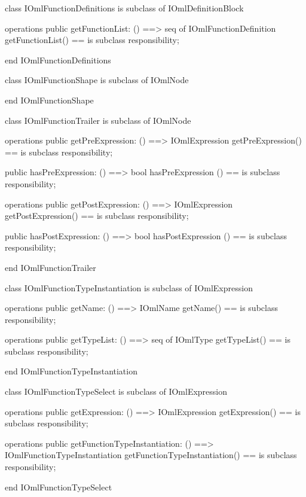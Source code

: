 \begin{vdm_al}
class IOmlFunctionDefinitions
 is subclass of IOmlDefinitionBlock

operations
  public getFunctionList: () ==> seq of IOmlFunctionDefinition
  getFunctionList() == is subclass responsibility;

end IOmlFunctionDefinitions
\end{vdm_al}

\begin{vdm_al}
class IOmlFunctionShape
 is subclass of IOmlNode

end IOmlFunctionShape
\end{vdm_al}

\begin{vdm_al}
class IOmlFunctionTrailer
 is subclass of IOmlNode

operations
  public getPreExpression: () ==> IOmlExpression
  getPreExpression() == is subclass responsibility;

  public hasPreExpression: () ==> bool
  hasPreExpression () == is subclass responsibility;

operations
  public getPostExpression: () ==> IOmlExpression
  getPostExpression() == is subclass responsibility;

  public hasPostExpression: () ==> bool
  hasPostExpression () == is subclass responsibility;

end IOmlFunctionTrailer
\end{vdm_al}

\begin{vdm_al}
class IOmlFunctionTypeInstantiation
 is subclass of IOmlExpression

operations
  public getName: () ==> IOmlName
  getName() == is subclass responsibility;

operations
  public getTypeList: () ==> seq of IOmlType
  getTypeList() == is subclass responsibility;

end IOmlFunctionTypeInstantiation
\end{vdm_al}

\begin{vdm_al}
class IOmlFunctionTypeSelect
 is subclass of IOmlExpression

operations
  public getExpression: () ==> IOmlExpression
  getExpression() == is subclass responsibility;

operations
  public getFunctionTypeInstantiation: () ==> IOmlFunctionTypeInstantiation
  getFunctionTypeInstantiation() == is subclass responsibility;

end IOmlFunctionTypeSelect
\end{vdm_al}

